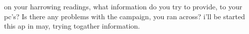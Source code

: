on your harrowing readings, what information do you try to provide, to your pc's? Is there any problems with the campaign, you ran across? i'll be started this ap in may, trying togather information.\\

